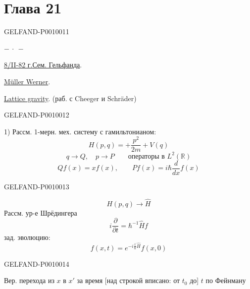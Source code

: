 \section*{Глава 21}
\begin{GelfandAdjacentEvidence}{GELFAND-P001001}{1}
\begin{center}$-\ \cdot\ -$\end{center}
\underline{\underline{8/II-82 г.}}\qquad\underline{Сем. Гельфанда}.

\underline{\underline{Müller Werner}}.

\underline{Lattice gravity}. (раб. с Cheeger и Schräder)
\end{GelfandAdjacentEvidence}
\begin{GelfandAdjacentEvidence}{GELFAND-P001001}{2}


1) Рассм. 1-мерн. мех. систему с гамильтонианом:
\begin{equation*}
H(p,q)=+\frac{p^2}{2m}+V(q)
\tag{1}
\end{equation*}
\[
q\to Q,\quad p\to P\qquad \text{операторы в }L^2(\mathbb R)
\]
\[
Qf(x)=xf(x),\qquad Pf(x)=i\hbar\frac{d}{dx}f(x)
\]
\end{GelfandAdjacentEvidence}
\begin{GelfandAdjacentEvidence}{GELFAND-P001001}{3}

\[
H(p,q)\to\widehat H
\]
Рассм. ур-е Шрёдингера
\begin{equation*}
i\frac{\partial}{\partial t}=\hbar^{-1}\widehat H f
\tag{2}
\end{equation*}
зад. эволюцию:
\begin{equation*}
f(x,t)=e^{-i\frac{t}{\hbar}\widehat H}f(x,0)
\tag{3}
\end{equation*}
\end{GelfandAdjacentEvidence}
\begin{GelfandAdjacentEvidence}{GELFAND-P001001}{4}


Вер. перехода из $x$ в $x'$ за время [над строкой вписано: от $t_0$ до] $t$ по Фейнману
\end{GelfandAdjacentEvidence}
